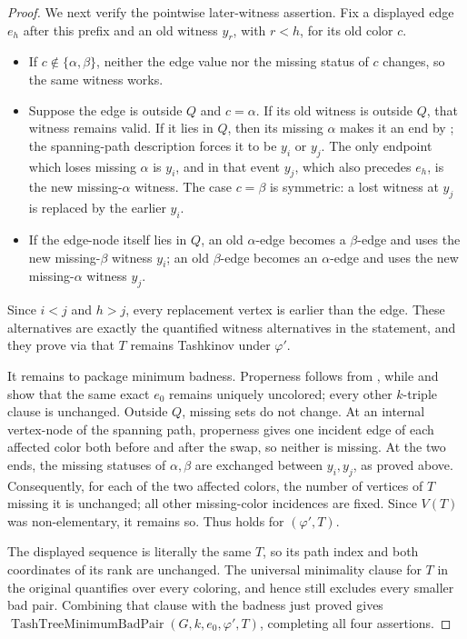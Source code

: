 \begin{proof}
We next verify the pointwise later-witness assertion.  Fix a displayed
edge \(e_h\) after this prefix and an old witness \(y_r\), with \(r<h\),
for its old color \(c\).
\begin{itemize}
\item If \(c\notin\{\alpha,\beta\}\), neither the edge value nor the
missing status of \(c\) changes, so the same witness works.
\item Suppose the edge is outside \(Q\) and \(c=\alpha\).  If its old
witness is outside \(Q\), that witness remains valid.  If it lies in
\(Q\), then its missing \(\alpha\) makes it an end by
; the spanning-path description
forces it to be \(y_i\) or \(y_j\).  The only endpoint which loses missing
\(\alpha\) is \(y_i\), and in that event \(y_j\), which also precedes
\(e_h\), is the new missing-\(\alpha\) witness.  The case \(c=\beta\)
is symmetric: a lost witness at \(y_j\) is replaced by the earlier
\(y_i\).
\item If the edge-node itself lies in \(Q\), an old \(\alpha\)-edge
becomes a \(\beta\)-edge and uses the new missing-\(\beta\) witness
\(y_i\); an old \(\beta\)-edge becomes an \(\alpha\)-edge and uses the
new missing-\(\alpha\) witness \(y_j\).
\end{itemize}
Since \(i<j\) and \(h>j\), every replacement vertex is earlier than the
edge.  These alternatives are exactly the quantified witness alternatives
in the statement, and they prove via  that \(T\)
remains Tashkinov under \(\varphi'\).

It remains to package minimum badness.  Properness follows from
, while
 and
 show that the same exact \(e_0\) remains
uniquely uncolored; every other \(k\)-triple clause is unchanged.  Outside
\(Q\), missing sets do not change.  At an internal vertex-node of the
spanning path, properness gives one incident edge of each affected color
both before and after the swap, so neither is missing.  At the two ends,
the missing statuses of \(\alpha,\beta\) are exchanged between
\(y_i,y_j\), as proved above.  Consequently, for each of the two affected
colors, the number of vertices of \(T\) missing it is unchanged; all other
missing-color incidences are fixed.  Since \(V(T)\) was non-elementary,
it remains so.  Thus  holds for
\((\varphi',T)\).

The displayed sequence is literally the same \(T\), so its path index and
both coordinates of its rank are unchanged.  The universal minimality
clause for \(T\) in the original
 quantifies over every coloring, and hence
still excludes every smaller bad pair.  Combining that clause with the
badness just proved gives
\( \operatorname{TashTreeMinimumBadPair}(G,k,e_0,\varphi',T)\), completing
all four assertions.
\end{proof}
